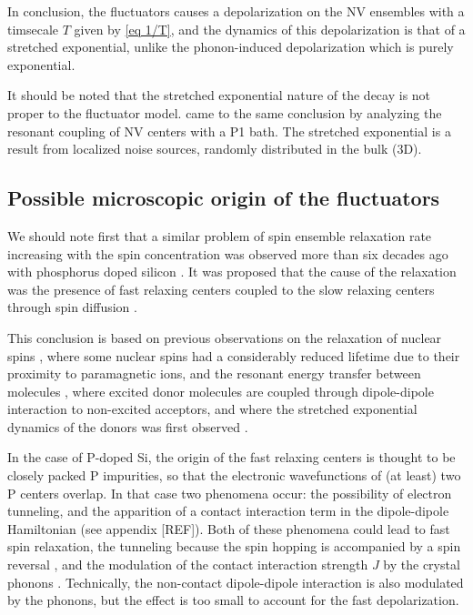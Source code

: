 \documentclass[a4paper,11pt]{report}
\begin{document}
In conclusion, the fluctuators causes a depolarization on the NV ensembles with a timsecale $T$ given by \ref{eq 1/T}, and the dynamics of this depolarization is that of a stretched exponential, unlike the phonon-induced depolarization which is purely exponential. 

It should be noted that the stretched exponential nature of the decay is not proper to the fluctuator model. \citep{hall2016detection} came to the same conclusion by analyzing the resonant coupling of NV centers with a P1 bath. The stretched exponential is a result from localized noise sources, randomly distributed in the bulk (3D).

\subsection{Possible microscopic origin of the fluctuators}

We should note first that a similar problem of spin ensemble relaxation rate increasing with the spin concentration was observed more than six decades ago with phosphorus doped silicon \citep{feher1959electron,honig1960electron}. It was proposed that the cause of the relaxation was the presence of fast relaxing centers coupled to the slow relaxing centers through spin diffusion \citep{honig1960electron, sugihara1963spin, yang1968concentration, vugmeister1978spin, berman2005spin}. 

This conclusion is based on previous observations on the relaxation of nuclear spins \citep{bloembergen1949interaction, de1958relaxation, blumberg1960nuclear}, where some nuclear spins had a considerably reduced lifetime due to their proximity to paramagnetic ions, and the resonant energy transfer between molecules \citep{forster1949experimentelle, eisenthal1964influence, yokota1967effects}, where excited donor molecules are coupled through dipole-dipole interaction to non-excited acceptors, and where the stretched exponential dynamics of the donors was first observed \citep{forster1949experimentelle}.

In the case of P-doped Si, the origin of the fast relaxing centers is thought to be closely packed P impurities, so that the electronic wavefunctions of (at least) two P centers overlap. In that case two phenomena occur: the possibility of electron tunneling, and the apparition of a contact interaction term in the dipole-dipole Hamiltonian (see appendix [REF]). Both of these phenomena could lead to fast spin relaxation, the tunneling because the spin hopping is accompanied by a spin reversal \citep{sugihara1963spin}, and the modulation of the contact interaction strength $J$ by the crystal phonons \citep{honig1960electron}. Technically, the non-contact dipole-dipole interaction is also modulated by the phonons, but the effect is too small to account for the fast depolarization.
\end{document}
